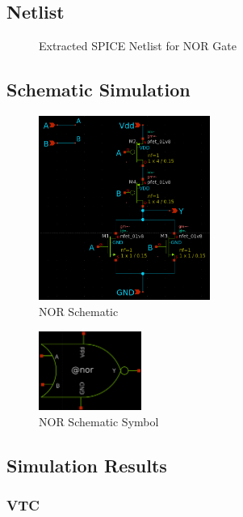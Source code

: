 \documentclass{article}
\begin{document}
	\subsection{Netlist}
	
	\begin{figure}[H]
		
		\caption{Extracted SPICE Netlist for NOR Gate}
		\label{fig::nor_netlist}
	\end{figure}
	
	\subsection{Schematic Simulation}
	
	\begin{figure}[H]
		\centerline{\includegraphics[width=0.5\textwidth]{nor_schematic.png}}
		\caption{NOR Schematic}
		\label{fig::nor_sechematic}
	\end{figure}
	
	\begin{figure}[H]
		\centerline{\includegraphics[width=0.3\textwidth]{nor_symbol.png}}
		\caption{NOR Schematic Symbol}
		\label{fig::nor_symbol}
	\end{figure}
	
	\subsection{Simulation Results}
	
	\subsubsection{VTC}
	
\end{document}
